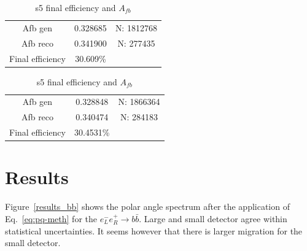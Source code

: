 \documentclass[preprint]{elsarticle}
\begin{document}
\begin{table}[h!]
    \parbox{.45\linewidth}{
    \centering
    \begin{tabular}{ccc}
      \hline
      \hline
      	Afb gen				&	0.328685		&	N: 1812768	\\
      	Afb reco			&	0.341900		&	N: 277435		\\
      	Final efficiency	&	30.609\%		&	\\			
      \hline
      \hline
    \end{tabular}
    \caption{l5 final efficiency and $A_{fb}$}
    }
    \hfill
    \parbox{.45\linewidth}{
    \centering
    \begin{tabular}{ccc}
      \hline
      \hline
        Afb gen				&	0.328848		&	N: 1866364	\\
      	Afb reco			&	0.340474		&	N: 284183		\\
      	Final efficiency	&	30.4531\%	&						\\	
      \hline
      \hline
  \end{tabular}
  \caption{s5 final efficiency and $A_{fb}$}
  \label{tab:tt-eff}
  }
  
  \end{table}









\section{Results}
 
Figure~\ref{results_bb} shows the polar angle spectrum after the application of Eq.~\ref{eq:pq-meth} for the $e_{L}^{-}e_{R}^{+}\rightarrow b\bar{b}$. Large and small detector agree within statistical uncertainties. It seems however that there is larger migration for the small detector.  
\end{document}
